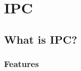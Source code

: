 \chapter{IPC}
\label{IPC}
\thispagestyle{empty}

\section{What is IPC?}
\label{whatisipc}



\subsection{Features}
\label{features}



